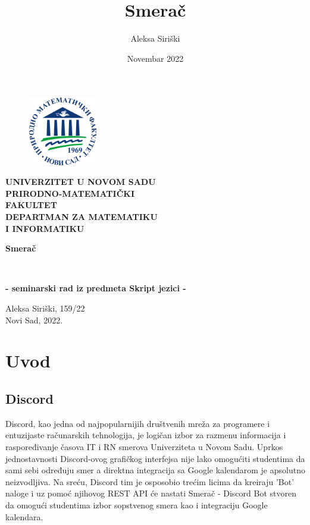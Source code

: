 \documentclass[a4paper,11pt]{article}
\title{Smerač}
\author{Aleksa Siriški}
\date{Novembar 2022}
\begin{document}
\pagestyle{empty}
\begin{center}
    \begin{figure}
        \centering
        \includegraphics[height=3cm,width=3cm]{pmf}
    \end{figure}

    \textbf{
    UNIVERZITET U NOVOM SADU
    \\
    PRIRODNO-MATEMATIČKI
    \\
    FAKULTET
    \\
    DEPARTMAN ZA MATEMATIKU
    \\
    I INFORMATIKU
    }

\end{center}
\vfill
\begin{center}
	\begin{huge}
		\textbf{Smerač}
		\bigskip 
	\end{huge}
	\\
	\begin{large}
        \textbf{- seminarski rad iz predmeta Skript jezici -}
	\end{large}
\end{center}
\vfill
\begin{center}
    Aleksa Siriški, 159/22
    \\
    Novi Sad, 2022.
\end{center}
\newpage

\pagestyle{plain}
\renewcommand{\contentsname}{Sadržaj}
\tableofcontents
\newpage

\pagestyle{fancy}
\cfoot{\thepage}

\section{Uvod}
\subsection{Discord}
Discord\cite{discord}, kao jedna od najpopularnijih društvenih mreža za programere i entuzijaste računarskih tehnologija, je logičan izbor za razmenu informacija i raspoređivanje časova IT i RN smerova Univerziteta u Novom Sadu. Uprkos jednostavnosti Discord-ovog grafičkog interfejsa nije lako omogućiti studentima da sami sebi određuju smer a direktna integracija sa Google kalendarom je apsolutno neizvodljiva. Na sreću, Discord tim je osposobio trećim licima da kreiraju 'Bot' naloge i uz pomoć njihovog REST API će nastati Smerač - Discord Bot stvoren da omogući studentima izbor sopstvenog smera kao i integraciju Google kalendara.
\end{document}

